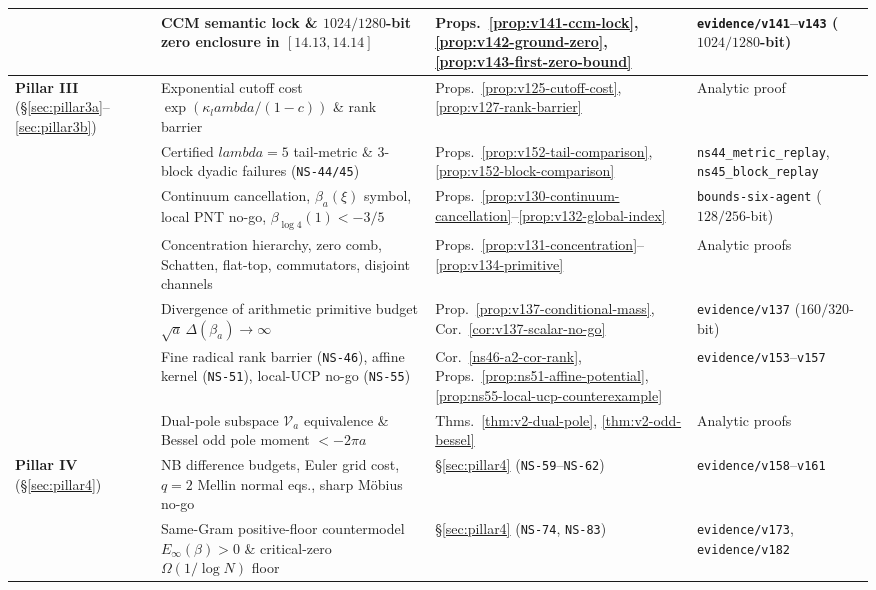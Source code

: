 \documentclass[11pt]{article}
\def\lambda{lambda}%
\theoremstyle{remark}
\begin{document}
\begin{table}[htbp]
\begin{tabular}{>{\raggedright\arraybackslash}p{2.1cm}>{\raggedright\arraybackslash}p{5.5cm}>{\raggedright\arraybackslash}p{3.4cm}>{\raggedright\arraybackslash}p{3.5cm}}
 & CCM semantic lock \& $1024/1280$-bit zero enclosure in $[14.13,14.14]$ & Props.~\ref{prop:v141-ccm-lock}, \ref{prop:v142-ground-zero}, \ref{prop:v143-first-zero-bound} & \texttt{evidence/v141}--\texttt{v143} ($1024/1280$-bit) \\
\midrule
\textbf{Pillar III} (\S\ref{sec:pillar3a}--\ref{sec:pillar3b}) & Exponential cutoff cost $\exp(\kappa_\lambda/(1-c))$ \& rank barrier & Props.~\ref{prop:v125-cutoff-cost}, \ref{prop:v127-rank-barrier} & Analytic proof \\
 & Certified $\lambda=5$ tail-metric \& 3-block dyadic failures (\texttt{NS-44/45}) & Props.~\ref{prop:v152-tail-comparison}, \ref{prop:v152-block-comparison} & \texttt{ns44\_metric\_replay}, \texttt{ns45\_block\_replay} \\
 & Continuum cancellation, $\beta_a(\xi)$ symbol, local PNT no-go, $\beta_{\log 4}(1)<-3/5$ & Props.~\ref{prop:v130-continuum-cancellation}--\ref{prop:v132-global-index} & \texttt{bounds-six-agent} ($128/256$-bit) \\
 & Concentration hierarchy, zero comb, Schatten, flat-top, commutators, disjoint channels & Props.~\ref{prop:v131-concentration}--\ref{prop:v134-primitive} & Analytic proofs \\
 & Divergence of arithmetic primitive budget $\sqrt{a}\,\Delta(\beta_a)\to\infty$ & Prop.~\ref{prop:v137-conditional-mass}, Cor.~\ref{cor:v137-scalar-no-go} & \texttt{evidence/v137} ($160/320$-bit) \\
 & Fine radical rank barrier (\texttt{NS-46}), affine kernel (\texttt{NS-51}), local-UCP no-go (\texttt{NS-55}) & Cor.~\ref{ns46-a2-cor-rank}, Props.~\ref{prop:ns51-affine-potential}, \ref{prop:ns55-local-ucp-counterexample} & \texttt{evidence/v153}--\texttt{v157} \\
 & Dual-pole subspace $\mathcal V_a$ equivalence \& Bessel odd pole moment $<-2\pi a$ & Thms.~\ref{thm:v2-dual-pole}, \ref{thm:v2-odd-bessel} & Analytic proofs \\
\midrule
\textbf{Pillar IV} (\S\ref{sec:pillar4}) & NB difference budgets, Euler grid cost, $q=2$ Mellin normal eqs., sharp Möbius no-go & \S\ref{sec:pillar4} (\texttt{NS-59}--\texttt{NS-62}) & \texttt{evidence/v158}--\texttt{v161} \\
 & Same-Gram positive-floor countermodel $E_\infty(\beta)>0$ \& critical-zero $\Omega(1/\log N)$ floor & \S\ref{sec:pillar4} (\texttt{NS-74}, \texttt{NS-83}) & \texttt{evidence/v173}, \texttt{evidence/v182} \\
\bottomrule
\end{tabular}
\end{table}
\end{document}
